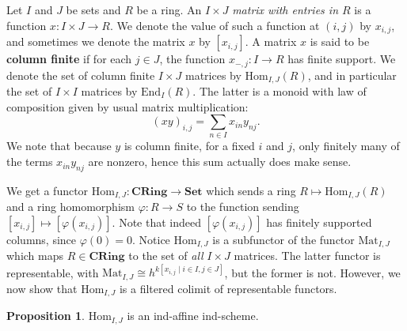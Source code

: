 \documentclass[oneside,11pt]{amsart}
\newcommand{\bSet}{\ensuremath{\textbf{Set}}}
\newcommand{\bCRing}{\ensuremath{\textbf{CRing}}}
\newcommand{\Hom}{\ensuremath{\text{Hom}}}
\newcommand{\Mat}{\ensuremath{\text{Mat}}}
\newcommand{\End}{\ensuremath{\text{End}}}
\theoremstyle{definition}
\newtheorem{proof techniques}{Proof Techniques}
\newtheorem{proposition}{Proposition}
\begin{document}
Let $I$ and $J$ be sets and $R$ be a ring. An $I \times J$ \emph{matrix with entries in $R$} is a function $x : I \times J \to R$. We denote the value of such a function at $(i , j)$ by $x_{i , j}$, and sometimes we denote the matrix $x$ by $[x_{i, j}]$. A matrix $x$ is said to be \textbf{column finite} if for each $j \in J$, the function $x_{- , j} : I \to R$ has finite support.  We denote the set of column finite $I \times J$ matrices by $\Hom_{I, J}(R)$, and in particular the set of $I \times I$ matrices by $\End_{I}(R)$. The latter is a monoid with law of composition given by usual matrix multiplication: 
\begin{equation*}
(xy)_{i , j} = \sum_{n \in I} x_{i n} y_{n j}.
\end{equation*}
We note that because $y$ is column finite, for a fixed $i$ and $j$, only finitely many of the terms $x_{i n} y_{n j}$ are nonzero, hence this sum actually does make sense. 

We get a functor $\Hom_{I , J} : \bCRing \to \bSet$ which sends a ring $R \mapsto \Hom_{I , J}(R)$ and a ring homomorphism $\varphi : R \to S$ to the function sending $[x_{i, j}] \mapsto [\varphi(x_{i, j})]$. Note that indeed $[\varphi(x_{i, j})]$ has finitely supported columns, since $\varphi(0) = 0$. Notice $\Hom_{I , J}$ is a subfunctor of the functor $\Mat_{I , J}$ which maps $R \in \bCRing$ to the set of \emph{all} $I \times J$ matrices. The latter functor is representable, with $\Mat_{I, J} \cong h^{k[x_{i, j} \mid i \in I , j \in J ]}$, but the former is not. However, we now show that $\Hom_{I , J}$ is a filtered colimit of representable functors. 

\begin{proposition} \label{prop: end is an ind-affine ind-scheme}
$\Hom_{I , J}$ is an ind-affine ind-scheme.
\end{proposition}
\end{document}
